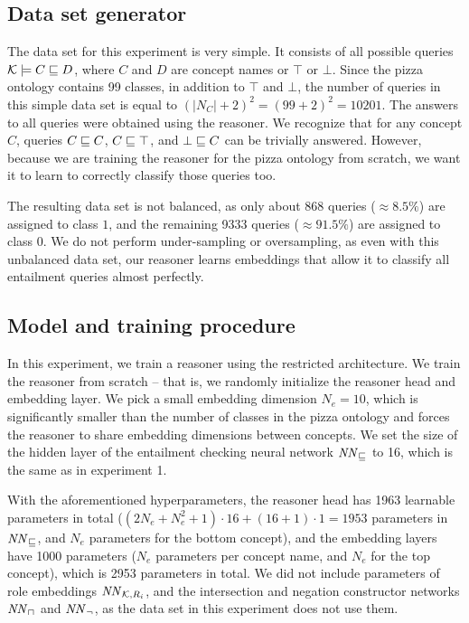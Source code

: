 \subsection{Data set generator}

The data set for this experiment is very simple.
It consists of all possible queries $\mathcal{K} \models C \sqsubseteq D$, where $C$ and $D$ are concept names or $\top$ or $\bot$.
Since the pizza ontology contains 99 classes, in addition to $\top$ and $\bot$, the number of queries in this simple data set is equal to $(|N_C| + 2)^2 = (99 + 2)^2 = 10201$.
The answers to all queries were obtained using the \factpp{} reasoner.
We recognize that for any concept $C$, queries $C \sqsubseteq C$, $C \sqsubseteq \top$, and $\bot \sqsubseteq C$ can be trivially answered.
However, because we are training the reasoner for the pizza ontology from scratch, we want it to learn to correctly classify those queries too.

The resulting data set is not balanced, as only about 868 queries ($\approx 8.5\%$) are assigned to class $1$, and the remaining 9333 queries ($\approx 91.5\%$) are assigned to class $0$.
We do not perform under-sampling or oversampling, as even with this unbalanced data set, our reasoner learns embeddings that allow it to classify all entailment queries almost perfectly.

\subsection{Model and training procedure}

In this experiment, we train a reasoner using the restricted architecture.
We train the reasoner from scratch -- that is, we randomly initialize the reasoner head and embedding layer.
We pick a small embedding dimension $N_e = 10$, which is significantly smaller than the number of classes in the pizza ontology and forces the reasoner to share embedding dimensions between concepts.
We set the size of the hidden layer of the entailment checking neural network $\mathit{NN}_\sqsubseteq$ to 16, which is the same as in experiment 1.

With the aforementioned hyperparameters, the reasoner head has 1963 learnable parameters in total ($(2N_e + N_e^2 + 1) \cdot 16 + (16 + 1) \cdot 1 = 1953$ parameters in $\mathit{NN}_\sqsubseteq$, and $N_e$ parameters for the bottom concept), and the embedding layers have 1000 parameters ($N_e$ parameters per concept name, and $N_e$ for the top concept), which is 2953 parameters in total.
We did not include parameters of role embeddings $\mathit{NN}_{\mathcal{K},R_i}$, and the intersection and negation constructor networks $\mathit{NN}_\sqcap$ and $\mathit{NN}_\lnot$, as the data set in this experiment does not use them.

